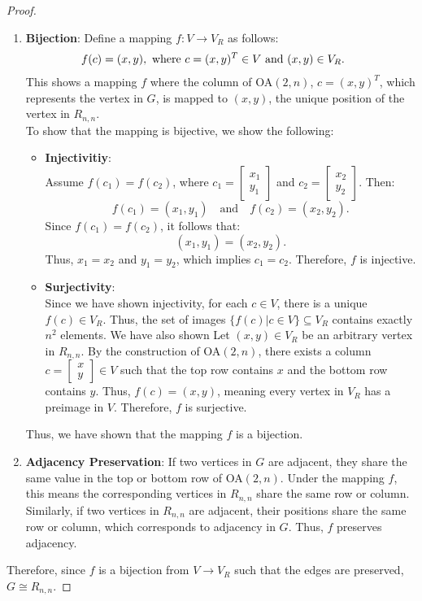 \documentclass{article}
\begin{document}
\begin{proof}
\begin{enumerate}
    \item \textbf{Bijection}: 
    Define a mapping \(f: V \to V_R\) as follows:
    \begin{align*}
        f(c) &= (x,y), \text{  where \( c = (x,y)^T \in V \) and \((x,y) \in V_R\). }
    \end{align*}
    This shows a mapping $f$ where the column of OA\((2,n)\), \(c = (x,y)^T\), which represents the vertex in $G$, is mapped to $(x,y)$, the unique position of the vertex in $R_{n,n}$. \\
    To show that the mapping is bijective, we show the following:
    \begin{itemize}
        \item \textbf{Injectivitiy}: \\
        Assume \(f(c_1) = f(c_2)\), where \(c_1 = \begin{bmatrix} x_1 \\ y_1 \end{bmatrix}\) and \(c_2 = \begin{bmatrix} x_2 \\ y_2 \end{bmatrix}\). Then:
        \[
        f(c_1) = (x_1, y_1) \quad \text{and} \quad f(c_2) = (x_2, y_2).
        \]
        Since \(f(c_1) = f(c_2)\), it follows that:
        \[
        (x_1, y_1) = (x_2, y_2).
        \]
        Thus, \(x_1 = x_2\) and \(y_1 = y_2\), which implies \(c_1 = c_2\). Therefore, \(f\) is injective.
    
        \item \textbf{Surjectivity}: \\
        Since we have shown injectivity, for each \(c \in V\), there is a unique \(f(c) \in V_R\). Thus, the set of images \(\{f(c) | c \in V\} \subseteq V_R\) contains exactly \(n^2\) elements. We have also shown
        Let \((x, y) \in V_R\) be an arbitrary vertex in \(R_{n,n}\). By the construction of OA\((2, n)\), there exists a column \(c = \begin{bmatrix} x \\ y \end{bmatrix} \in V\) such that the top row contains \(x\) and the bottom row contains \(y\). Thus, \(f(c) = (x, y)\), meaning every vertex in \(V_R\) has a preimage in \(V\). Therefore, \(f\) is surjective.
    \end{itemize} 
    Thus, we have shown that the mapping $f$ is a bijection.

    \item \textbf{Adjacency Preservation}: 
    If two vertices in \(G\) are adjacent, they share the same value in the top or bottom row of OA\((2,n)\). Under the mapping \(f\), this means the corresponding vertices in \(R_{n,n}\) share the same row or column. Similarly, if two vertices in \(R_{n,n}\) are adjacent, their positions share the same row or column, which corresponds to adjacency in \(G\). Thus, \(f\) preserves adjacency.

\end{enumerate}
Therefore, since $f$ is a bijection from $V\to V_R$ such that the edges are preserved, $G\cong R_{n,n}$.
    
\end{proof}
\end{document}
